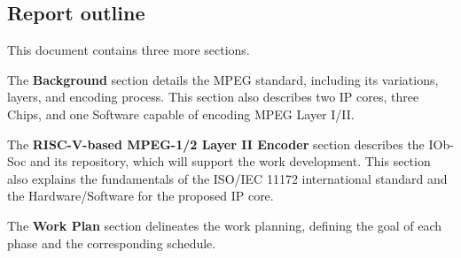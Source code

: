 \subsection{Report outline}

This document contains three more sections.

The \textbf{Background} section details the MPEG standard, including its variations, layers, and encoding process. This section also describes two IP cores, three Chips, and one Software capable of encoding MPEG Layer I/II.

The \textbf{RISC-V-based MPEG-1/2 Layer II Encoder} section describes the IOb-Soc and its repository, which will support the work development. This section also explains the fundamentals of the ISO/IEC 11172 international standard and the Hardware/Software for the proposed IP core.

The \textbf{Work Plan} section delineates the work planning, defining the goal of each phase and the corresponding schedule.